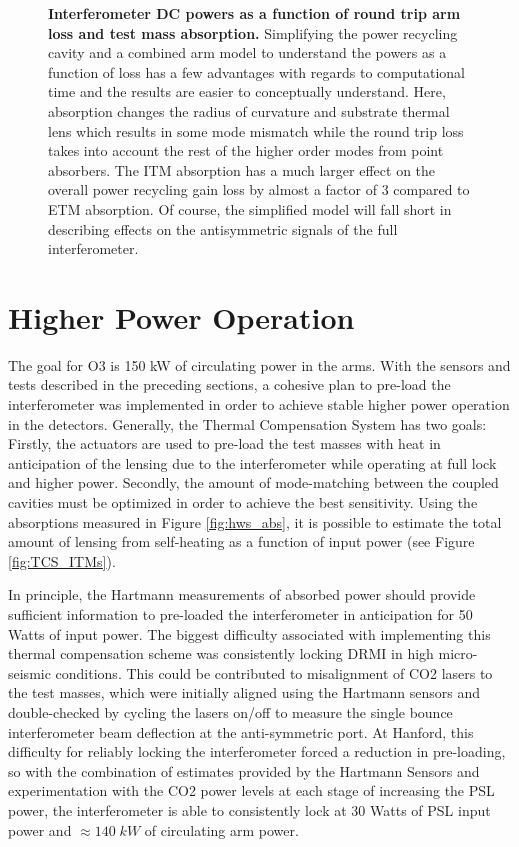\begin{figure}
\begin{minipage}{0.5\textheight}
		\end{minipage}
		\caption[Interferometer DC powers as a function of round trip arm loss and test mass absorption.]  
		{\textbf{Interferometer DC powers as a function of round trip arm loss and test mass absorption.}
			Simplifying the power recycling cavity and a combined arm model to understand the powers as a function of loss has a few advantages with regards to computational time and the results are easier to conceptually understand.  Here, absorption changes the radius of curvature and substrate thermal lens which results in some mode mismatch while the round trip loss takes into account the rest of the higher order modes from point absorbers.  The ITM absorption has a much larger effect on the overall power recycling gain loss by almost a factor of 3 compared to ETM absorption.  Of course, the simplified model will fall short in describing effects on the antisymmetric signals of the full interferometer.
		}
		\label{fig:simple_prc_arm}
	\end{figure}

\clearpage

\section{Higher Power Operation}
	The goal for O3 is 150 kW of circulating power in the arms. With the sensors and tests described in the preceding sections, a cohesive plan to pre-load the interferometer was implemented in order to achieve stable higher power operation in the detectors.  Generally, the Thermal Compensation System has two goals: Firstly, the actuators are used to pre-load the test masses with heat in anticipation of the lensing due to the interferometer while operating at full lock and higher power.  Secondly, the amount of mode-matching between the coupled cavities must be optimized in order to achieve the best sensitivity.  Using the absorptions measured in Figure \ref{fig:hws_abs}, it is possible to estimate the total amount of lensing from self-heating as a function of input power (see Figure \ref{fig:TCS_ITMs}).

	In principle, the Hartmann measurements of absorbed power should provide sufficient information to pre-loaded the interferometer in anticipation for 50 Watts of input power.  The biggest difficulty associated with implementing this thermal compensation scheme was consistently locking DRMI in high micro-seismic conditions. This could be contributed to misalignment of CO2 lasers to the test masses, which were initially aligned using the Hartmann sensors and double-checked by cycling the lasers on/off to measure the single bounce interferometer beam deflection at the anti-symmetric port. At Hanford, this difficulty for reliably locking the interferometer forced a reduction in pre-loading, so with the combination of estimates provided by the Hartmann Sensors and experimentation with the CO2 power levels at each stage of increasing the PSL power, the interferometer is able to consistently lock at 30 Watts of PSL input power and $\approx 140 \; kW$ of circulating arm power. 
	
